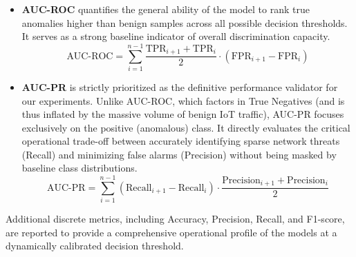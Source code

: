 \documentclass[final,twocolumn,10pt]{elsarticle}
\begin{document}
\begin{itemize}

    \item \textbf{AUC-ROC} quantifies the general ability of the model to rank true anomalies higher than benign samples across all possible decision thresholds. It serves as a strong baseline indicator of overall discrimination capacity.
    \[ \text{AUC-ROC} = \sum_{i=1}^{n-1} \frac{\text{TPR}_{i+1} + \text{TPR}_i}{2} \cdot (\text{FPR}_{i+1} - \text{FPR}_i) \]
    
    \item \textbf{AUC-PR} is strictly prioritized as the definitive performance validator for our experiments. Unlike AUC-ROC, which factors in True Negatives (and is thus inflated by the massive volume of benign IoT traffic), AUC-PR focuses exclusively on the positive (anomalous) class. It directly evaluates the critical operational trade-off between accurately identifying sparse network threats (Recall) and minimizing false alarms (Precision) without being masked by baseline class distributions.
    \[ \text{AUC-PR} = \sum_{i=1}^{n-1} (\text{Recall}_{i+1} - \text{Recall}_i) \cdot \frac{\text{Precision}_{i+1} + \text{Precision}_i}{2} \]
\end{itemize}

Additional discrete metrics, including Accuracy, Precision, Recall, and F1-score, are reported to provide a comprehensive operational profile of the models at a dynamically calibrated decision threshold.
\end{document}
